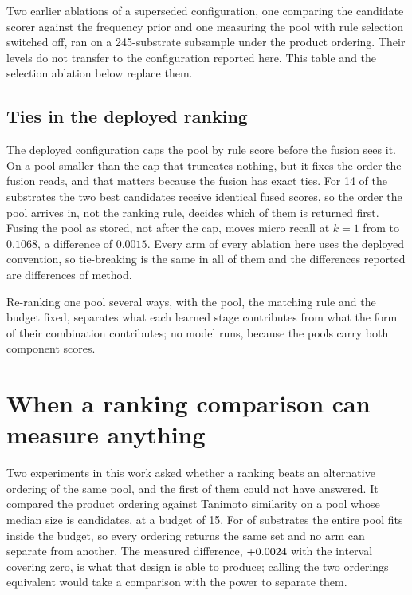 \documentclass[journal=jcisd8,manuscript=suppinfo,layout=onecolumn]{achemso}
\begin{document}
Two earlier ablations of a superseded configuration, one comparing the candidate scorer against the
frequency prior and one measuring the pool with rule selection switched off, ran on a
245-substrate subsample under the product ordering. Their levels do not transfer to the
configuration reported here. This table and the selection ablation below replace them.

\subsection{Ties in the deployed ranking}

The deployed configuration caps the pool by rule score before the fusion sees it. On a pool
smaller than the cap that truncates nothing, but it fixes the order the fusion reads, and that
matters because the fusion has exact ties. For 14 of the \numPopulationN{} substrates the two
best candidates receive identical fused scores, so the order the pool arrives in, not the ranking
rule, decides which of them is returned first. Fusing the pool as stored, not after
the cap, moves micro recall at $k=1$ from \numSelLearnedOne{} to $0.1068$, a
difference of $0.0015$. Every arm of every ablation here uses the deployed convention, so
tie-breaking is the same in all of them and the differences reported are differences of method.


Re-ranking one pool several ways, with the pool, the matching rule and the budget fixed, separates
what each learned stage contributes from what the form of their combination contributes; no model
runs, because the pools carry both component scores.
\section{When a ranking comparison can measure anything}
\label{sec:si-rankingpower}

Two experiments in this work asked whether a ranking beats an alternative ordering of the same
pool, and the first of them could not have answered. It compared the product ordering against
Tanimoto similarity on a pool whose median size is \numSimOldMedianPool{} candidates, at a budget
of 15. For \numSimOldPoolUnderBudget{} of \numSimOldN{} substrates the entire pool fits inside
the budget, so every ordering returns the same set and no arm can separate from another. The
measured difference, $+0.0024$ with the interval covering zero, is what that design is
able to produce; calling the two orderings equivalent would take a comparison with the power to
separate them.
\end{document}
